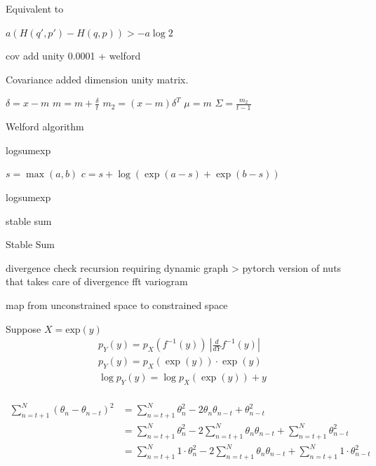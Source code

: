 \documentclass[]{report}
\begin{document}
Equivalent to 

$ a (H(q',p') - H(q,p) ) > -a \log 2 $ 

cov add unity 0.0001 + welford

Covariance added dimension unity matrix.

\begin{algorithm}
\DontPrintSemicolon
{}

$\delta = x-m$ \;
$m = m + \frac{\delta}{t} $\;
$m_2 = (x-m)\delta^T $ \;
$\mu = m $\;
$\Sigma = \frac{m_2}{t-1} $\;
\caption{Welford algorithm}
\end{algorithm}

logsumexp
\begin{algorithm}
\DontPrintSemicolon
{}
$s = \max(a,b) $\;
$c = s + \log( \exp(a-s) + \exp(b-s)) $\;

\caption{logsumexp}
\end{algorithm}


stable sum 
\begin{algorithm}
\DontPrintSemicolon
{}

\caption{Stable Sum }
\end{algorithm}

divergence check 
recursion requiring dynamic graph  > pytorch
version of nuts that takes care of divergence
fft variogram

map from unconstrained space to constrained space

Suppose $ X = \text{exp}(y) $  
\begin{align*}
p_Y(y) = p_X(f^{-1}(y)) \ |\frac{d}{dY} f^{-1}(y) |\\
p_Y(y) = p_X(\exp(y)) \cdot \exp(y) \\
\log p_Y(y) = \log p_X(\exp(y)) + y \\
\end{align*}

\begin{align*}
 \sum_{n=t+1}^N (\theta_{n} - \theta_{n-t})^2 &= \sum_{n=t+1}^N \theta_n^2 - 2 \theta_n \theta_{n-t} + \theta_{n-t}^2  \\
 &= \sum_{n=t+1}^N \theta_n^2 -2 \sum_{n=t+1}^N \theta_n \theta_{n-t} + \sum_{n=t+1}^N \theta_{n-t}^2 \\ 
  &= \sum_{n=t+1}^N 1 \cdot \theta_n^2 -2 \sum_{n=t+1}^N \theta_n \theta_{n-t} + \sum_{n=t+1}^N 1 \cdot \theta_{n-t}^2 \\
\end{align*}
\end{document}
